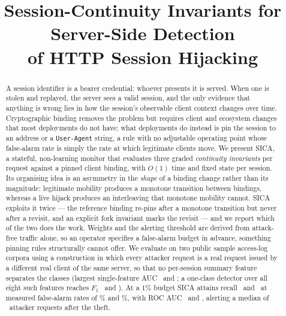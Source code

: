 \documentclass[conference]{IEEEtran}
\begin{document}
\title{Session-Continuity Invariants for Server-Side Detection\\ of HTTP Session Hijacking}

\author{
}

\maketitle

\begin{abstract}
A session identifier is a bearer credential: whoever presents it is served.
When one is stolen and replayed, the server sees a valid session, and the only
evidence that anything is wrong lies in how the session's observable client
context changes over time.  Cryptographic binding removes the problem but
requires client and ecosystem changes that most deployments do not have;
what deployments do instead is pin the session to an address or a
\texttt{User-Agent} string, a rule with no adjustable operating point whose
false-alarm rate is simply the rate at which legitimate clients move.  We
present SICA, a stateful, non-learning monitor that evaluates three graded
\emph{continuity invariants} per request against a pinned client binding, with
$O(1)$ time and fixed state per session.  Its organising idea is an asymmetry in
the \emph{shape} of a binding change rather than its magnitude: legitimate
mobility produces a monotone transition between bindings, whereas a live hijack
produces an interleaving that monotone mobility cannot.  SICA exploits it
twice --- the reference binding re-pins after a monotone transition but never
after a revisit, and an explicit fork invariant marks the revisit --- and we
report which of the two does the work.  Weights and the alerting threshold are
derived from attack-free traffic alone, so an operator specifies a false-alarm
budget in advance, something pinning rules structurally cannot offer.  We
evaluate on two public sample access-log corpora using a construction in which every
attacker request is a real request issued by a different real client of the same
server, so that no per-session summary feature separates the classes (largest
single-feature AUC \margMaxWeb\ and \margMaxApt; a one-class detector over all
eight such features reaches $F_1$ \contentFoneWeb\ and \contentFoneApt).  At a
$1\%$ budget SICA attains recall \recallWeb\ and \recallApt\ at measured
false-alarm rates of \fprWeb\% and \fprApt\%, with ROC AUC \aucWeb\ and
\aucApt, alerting a median of \latWeb\ attacker requests after the theft.

\end{abstract}
\end{document}
